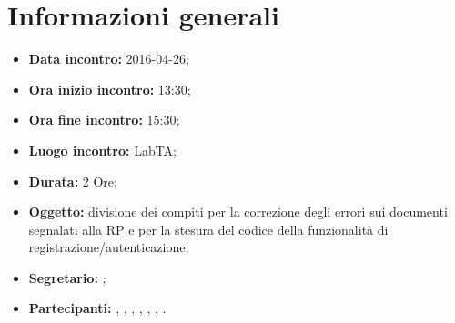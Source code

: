 \newpage
\section{Informazioni generali}
\begin{itemize}
\item \textbf{Data incontro:} 2016-04-26;
\item \textbf{Ora inizio incontro:} 13:30;
\item \textbf{Ora fine incontro:} 15:30;
\item \textbf{Luogo incontro:} LabTA;
\item \textbf{Durata:} 2 Ore;
\item \textbf{Oggetto:} divisione dei compiti per la correzione degli errori sui documenti segnalati alla RP e per la stesura del codice della funzionalità di registrazione/autenticazione;
\item \textbf{Segretario:} \SM;
\item \textbf{Partecipanti:} \AF, \FB, \GN, \GR, \MV, \MP, \SM.

\end{itemize}
